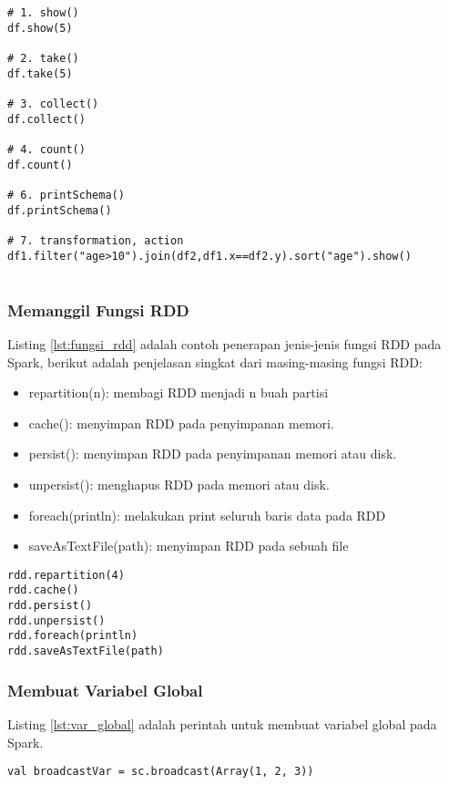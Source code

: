\begin{lstlisting}[basicstyle=\ttfamily, frame=single,
	columns=fullflexible, keepspaces=true, breaklines=true, label=lst:action, caption=Contoh Fungsi Action]
# 1. show()
df.show(5)

# 2. take()
df.take(5)

# 3. collect()
df.collect()

# 4. count()
df.count()

# 6. printSchema()
df.printSchema()

# 7. transformation, action
df1.filter("age>10").join(df2,df1.x==df2.y).sort("age").show()


\end{lstlisting}

\subsubsection{Memanggil Fungsi RDD}
\noindent Listing \ref{lst:fungsi_rdd} adalah contoh penerapan jenis-jenis fungsi RDD pada Spark, berikut adalah penjelasan singkat dari masing-masing fungsi RDD:

\begin{itemize}
\item repartition(n): membagi RDD menjadi n buah partisi
\item cache(): menyimpan RDD pada penyimpanan memori.
\item persist(): menyimpan RDD pada penyimpanan memori atau disk.
\item unpersist(): menghapus RDD pada memori atau disk.
\item foreach(println): melakukan print seluruh baris data pada RDD
\item saveAsTextFile(path): menyimpan RDD pada sebuah file
\end{itemize}

\begin{lstlisting}[basicstyle=\ttfamily, frame=single,
	columns=fullflexible, keepspaces=true, breaklines=true, label=lst:fungsi_rdd, caption=Contoh Fungsi RDD]
rdd.repartition(4)
rdd.cache() 
rdd.persist() 
rdd.unpersist()
rdd.foreach(println)
rdd.saveAsTextFile(path)

\end{lstlisting}

\subsubsection{Membuat Variabel Global}
\noindent Listing \ref{lst:var_global} adalah perintah untuk membuat variabel global pada Spark.
\begin{lstlisting}[basicstyle=\ttfamily, frame=single,
	columns=fullflexible, keepspaces=true, breaklines=true, label=lst:var_global, caption=Membuat Variabel Global]
val broadcastVar = sc.broadcast(Array(1, 2, 3))
\end{lstlisting}	

